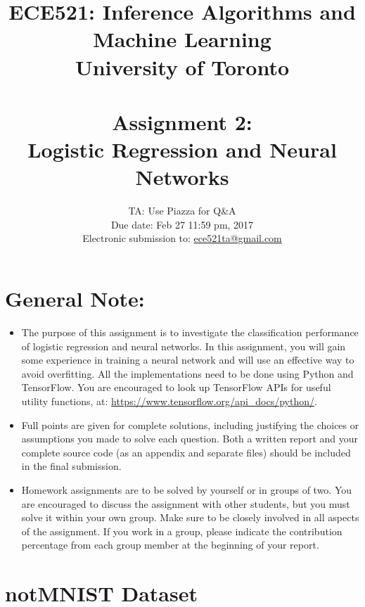 \documentclass[12pt,letterpaper]{article}
\begin{document}
\title{\vspace{-4ex}ECE521: Inference Algorithms and Machine Learning \\
University of Toronto\\ \  \\
Assignment 2: \\Logistic Regression and Neural Networks}
\date{\vspace{-8ex}TA: Use Piazza for Q\&A \\ Due date: Feb 27 11:59 pm, 2017 \\ Electronic submission to: \href{mailto:ece521ta@gmail.com}{ece521ta@gmail.com} }

\maketitle

\section*{General Note:}
\begin{itemize}
\item The purpose of this assignment is to investigate the classification performance of logistic regression and neural networks. In this assignment, you will gain some experience in training a neural network and will use an effective way to avoid overfitting. All the implementations need to be done using Python and TensorFlow. You are encouraged to look up TensorFlow APIs for useful utility functions,  at: \url{https://www.tensorflow.org/api_docs/python/}.
\item Full points are given for complete solutions, including justifying the choices or assumptions you made to solve each question. Both a written report and your complete source code (as an appendix and separate files) should be included in the final submission.
\item Homework assignments are to be solved by yourself or in groups of two. You are encouraged to discuss the assignment with other students, but you must solve it within your own group. Make sure to be closely involved in all aspects of the assignment. If you work in a group, please indicate the contribution percentage from each group member at the beginning of your report.
\end{itemize}


\section*{notMNIST Dataset}
\end{document}
